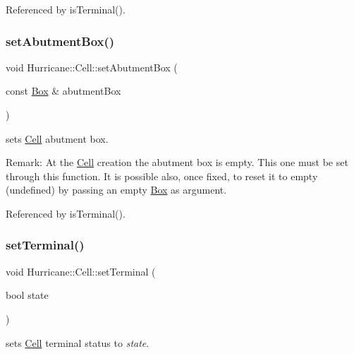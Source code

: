 Referenced by is\+Terminal().

\mbox{\label{classHurricane_1_1Cell_ab1949e2b708f0bd2d215ab90cfe864e0}} 
\subsubsection{\texorpdfstring{set\+Abutment\+Box()}{setAbutmentBox()}}
{\footnotesize\ttfamily void Hurricane\+::\+Cell\+::set\+Abutment\+Box (\begin{DoxyParamCaption}\item[{const \hyperlink{classHurricane_1_1Box}{Box} \&}]{abutment\+Box }\end{DoxyParamCaption})}

sets \hyperlink{classHurricane_1_1Cell}{Cell} abutment box.

\begin{DoxyParagraph}{Remark\+:}
At the \hyperlink{classHurricane_1_1Cell}{Cell} creation the abutment box is empty. This one must be set through this function. It is possible also, once fixed, to reset it to empty (undefined) by passing an empty \hyperlink{classHurricane_1_1Box}{Box} as argument. 
\end{DoxyParagraph}


Referenced by is\+Terminal().

\mbox{\label{classHurricane_1_1Cell_a4591dc37153a835daa42b442221742cb}} 
\subsubsection{\texorpdfstring{set\+Terminal()}{setTerminal()}}
{\footnotesize\ttfamily void Hurricane\+::\+Cell\+::set\+Terminal (\begin{DoxyParamCaption}\item[{bool}]{state }\end{DoxyParamCaption})\hspace{0.3cm}{\ttfamily [inline]}}

sets \hyperlink{classHurricane_1_1Cell}{Cell} terminal status to {\itshape state}. 

